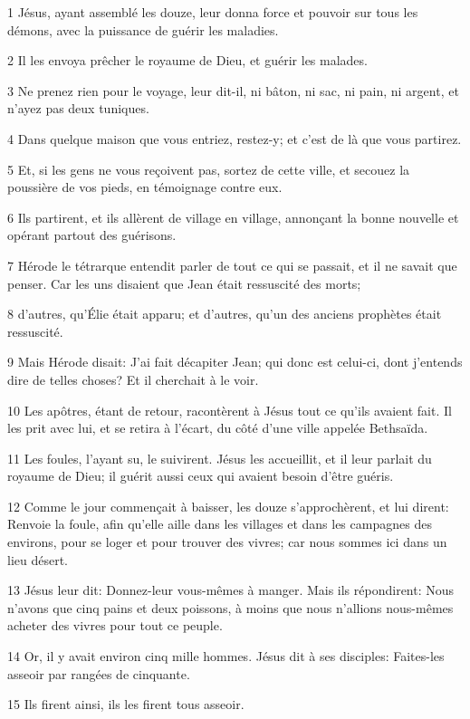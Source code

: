 \par 1 Jésus, ayant assemblé les douze, leur donna force et pouvoir sur tous les démons, avec la puissance de guérir les maladies.
\par 2 Il les envoya prêcher le royaume de Dieu, et guérir les malades.
\par 3 Ne prenez rien pour le voyage, leur dit-il, ni bâton, ni sac, ni pain, ni argent, et n'ayez pas deux tuniques.
\par 4 Dans quelque maison que vous entriez, restez-y; et c'est de là que vous partirez.
\par 5 Et, si les gens ne vous reçoivent pas, sortez de cette ville, et secouez la poussière de vos pieds, en témoignage contre eux.
\par 6 Ils partirent, et ils allèrent de village en village, annonçant la bonne nouvelle et opérant partout des guérisons.
\par 7 Hérode le tétrarque entendit parler de tout ce qui se passait, et il ne savait que penser. Car les uns disaient que Jean était ressuscité des morts;
\par 8 d'autres, qu'Élie était apparu; et d'autres, qu'un des anciens prophètes était ressuscité.
\par 9 Mais Hérode disait: J'ai fait décapiter Jean; qui donc est celui-ci, dont j'entends dire de telles choses? Et il cherchait à le voir.
\par 10 Les apôtres, étant de retour, racontèrent à Jésus tout ce qu'ils avaient fait. Il les prit avec lui, et se retira à l'écart, du côté d'une ville appelée Bethsaïda.
\par 11 Les foules, l'ayant su, le suivirent. Jésus les accueillit, et il leur parlait du royaume de Dieu; il guérit aussi ceux qui avaient besoin d'être guéris.
\par 12 Comme le jour commençait à baisser, les douze s'approchèrent, et lui dirent: Renvoie la foule, afin qu'elle aille dans les villages et dans les campagnes des environs, pour se loger et pour trouver des vivres; car nous sommes ici dans un lieu désert.
\par 13 Jésus leur dit: Donnez-leur vous-mêmes à manger. Mais ils répondirent: Nous n'avons que cinq pains et deux poissons, à moins que nous n'allions nous-mêmes acheter des vivres pour tout ce peuple.
\par 14 Or, il y avait environ cinq mille hommes. Jésus dit à ses disciples: Faites-les asseoir par rangées de cinquante.
\par 15 Ils firent ainsi, ils les firent tous asseoir.

